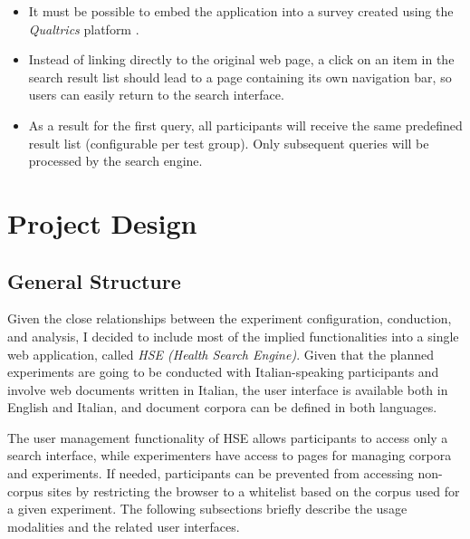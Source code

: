 \documentclass[a4paper]{usiinfbachelorproject}
\begin{document}
\begin{itemize}

    \item It must be possible to embed the application into a survey created using the \emph{Qualtrics} platform \cite{qualtricsHome}. 

    \item Instead of linking directly to the original web page, a click on an item in the search result list should lead
to a page containing its own navigation bar, so users can easily return to the search interface.

    \item As a result for the first query, all participants will receive the same predefined result list (configurable per
test group). Only subsequent queries will be processed by the search engine.

\end{itemize}

\section{\textbf{Project Design}} \label{sec:design}

\subsection{\textbf{General Structure}} \label{sec:designGeneral}

Given the close relationships between the experiment configuration, conduction, and analysis, I decided to include
most of the implied functionalities into a single web application, called \emph{HSE (Health Search Engine)}.
Given that the planned experiments are going to be conducted with Italian-speaking participants and involve
web documents written in Italian, the user interface is available both in English and Italian, and document
corpora can be defined in both languages.

The user management functionality of HSE allows participants to access only a search interface, while experimenters
have access to pages for managing corpora and experiments. If needed, participants can be prevented from
accessing non-corpus sites by restricting the browser to a whitelist based on the corpus used for a given experiment.
The following subsections briefly describe the usage modalities and the related user interfaces.
\end{document}
